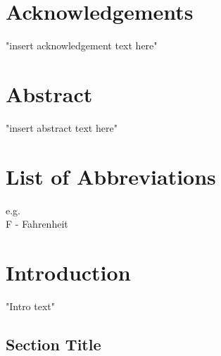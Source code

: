 \documentclass{ttuthes2014}
\newcommand{\tab}{\hspace*{2em}}  %
\begin{document}
\chapter{Acknowledgements}

\tab "insert acknowledgement text here"


\tableofcontents

\chapter{Abstract}

\tab "insert abstract text here"



\listoftables

\listoffigures

\chapter{List of Abbreviations}
e.g. \\
F - Fahrenheit \\




\mainmatter
\chapter{Introduction}  %

"Intro text"

\section{Section Title}  %
\end{document}
